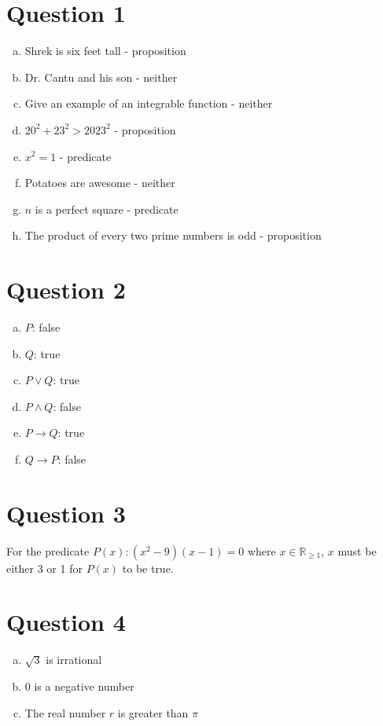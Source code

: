 \documentclass{article}
\begin{document}
\section*{Question 1}
\begin{enumerate}[(a)]
    \item Shrek is six feet tall - proposition
    \item Dr. Cantu and his son - neither
    \item Give an example of an integrable function - neither
    \item $20^2 + 23^2 > 2023^2$ - proposition
    \item $x^2 = 1$ - predicate
    \item Potatoes are awesome - neither
    \item $n$ is a perfect square - predicate
    \item The product of every two prime numbers is odd - proposition
\end{enumerate}

\section*{Question 2}
\begin{enumerate}[(a)]
    \item $P$: false
    \item $Q$: true
    \item $P \lor Q$: true
    \item $P \land Q$: false
    \item $P \rightarrow Q$: true
    \item $Q \rightarrow P$: false
\end{enumerate}

\section*{Question 3}
For the predicate $P(x): (x^2 - 9)(x - 1) = 0$ where $x \in \mathbb{R}_{\geq 1}$, $x$ must be either 3 or 1 for $P(x)$ to be true.

\section*{Question 4}
\begin{enumerate}[(a)]
    \item $\sqrt{3}$ is irrational
    \item 0 is a negative number
    \item The real number $r$ is greater than $\pi$
\end{enumerate}
\end{document}
